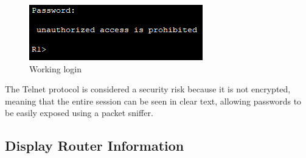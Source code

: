 \documentclass[a4paper]{article}
\newcommand{\abc}{\hfill \break}
\begin{document}
\begin{figure}[h]
	\includegraphics[scale=0.55]{images/banner.png}
	\centering
	\caption{Working login}
\end{figure}\abc
The Telnet protocol is considered a security risk because it is not encrypted, meaning that the entire session can be seen in clear text, allowing passwords to be easily exposed using a packet sniffer.
\subsection{Display Router Information}
\end{document}

